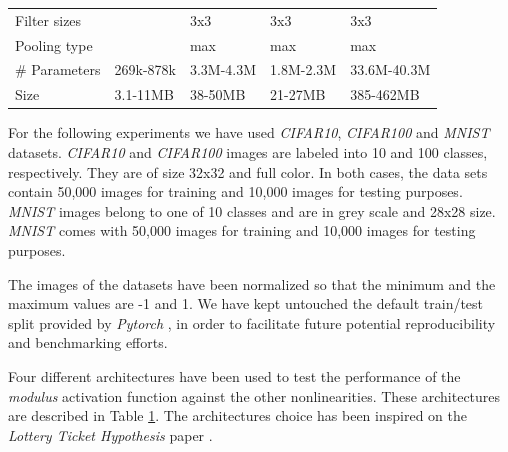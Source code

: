 \begin{table}[h]
\begin{tabular}[t]{lllll}
		Filter sizes &  & 3x3 & 3x3 & 3x3 \\
		Pooling type & & max & max & max \\
		\# Parameters        & 269k-878k       & 3.3M-4.3M   & 1.8M-2.3M                                            & 33.6M-40.3M                                                                             \\
		Size                 & 3.1-11MB & 38-50MB & 21-27MB & 385-462MB \\ \bottomrule
	\end{tabular}
	\label{tab:architectures}
	\vspace{20pt}
\end{table}

For the following experiments we have used \textit{CIFAR10}, \textit{CIFAR100} \autocite{krizhevsky09} and \textit{MNIST} \autocite{lecun2010} datasets. \textit{CIFAR10} and \textit{CIFAR100} images are labeled into 10 and 100 classes, respectively. They are of size 32x32 and full color. In both cases, the data sets contain 50,000 images for training and 10,000 images for testing purposes. \textit{MNIST} images belong to one of 10 classes and are in grey scale and 28x28 size. \textit{MNIST} comes with 50,000 images for training and 10,000 images for testing purposes.

The images of the datasets have been normalized so that the minimum and the maximum values are -1 and 1. We have kept untouched the default train/test split provided by \textit{Pytorch} \autocite{Paszke2019}, in order to facilitate future potential reproducibility and benchmarking efforts.

Four different architectures have been used to test the performance of the \textit{modulus} activation function against the other nonlinearities. These architectures are described in Table \ref{tab:architectures}. The architectures choice has been inspired on the \textit{Lottery Ticket Hypothesis} paper \autocite{frankleC19}.





